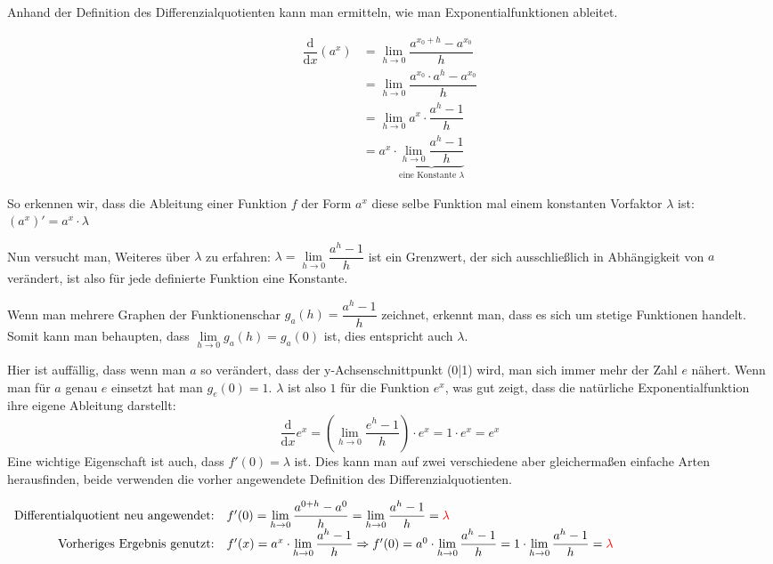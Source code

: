 \documentclass[main.tex]{subfiles}
\begin{document}
Anhand der Definition des Differenzialquotienten kann man ermitteln, wie man Exponentialfunktionen ableitet.

\begin{Beweis}
	\begin{align*}
		\dfrac{\text{d}}{\text{d}x}(a^x) &=\lim\limits_{h\to0}\dfrac{a^{{x_0}+h}-a^{x_0}}{h}\\
		&=\lim\limits_{h\to0}\dfrac{a^{x_0}\cdot a^h-a^{x_0}}{h}\\
		&=\lim\limits_{h\to0}a^x\cdot\dfrac{a^h-1}{h}\\
		&=a^x\cdot\underbrace{\lim\limits_{h\to0}\dfrac{a^h-1}{h}}_{\text{eine Konstante }\lambda}
	\end{align*}
\end{Beweis}

So erkennen wir, dass die Ableitung einer Funktion $f$ der Form $a^x$ diese selbe Funktion mal einem konstanten Vorfaktor $\lambda$ ist: $(a^x)'=a^x\cdot\lambda$

Nun versucht man, Weiteres über $\lambda$ zu erfahren: $\lambda=\lim\limits_{h\to0}\dfrac{a^h-1}{h}$ ist ein Grenzwert, der sich ausschließlich in Abhängigkeit von $a$ verändert,  ist also für jede definierte Funktion eine Konstante.

Wenn man mehrere Graphen der Funktionenschar $g_a(h)=\dfrac{a^h-1}{h}$ zeichnet, erkennt man, dass es sich um stetige Funktionen handelt. Somit kann man behaupten, dass $\lim\limits_{h\to0}g_a(h)=g_a(0)$ ist, dies entspricht auch $\lambda$.

Hier ist auffällig, dass wenn man $a$ so verändert, dass der y-Achsenschnittpunkt (0|1) wird, man sich immer mehr der Zahl $e$ nähert. Wenn man für $a$ genau $e$ einsetzt hat man $ g_e(0)=1$. $\lambda$ ist also $1$ für die Funktion $e^x$, was gut zeigt, dass die natürliche Exponentialfunktion ihre eigene Ableitung darstellt:
$$\dfrac{\text{d}}{\text{d}x}e^x=(\lim\limits_{h\to0}\dfrac{e^h-1}{h})\cdot e^x=1\cdot e^x=e^x$$
Eine wichtige Eigenschaft ist auch, dass $f'(0)=\lambda$ ist. Dies kann man auf zwei verschiedene aber gleichermaßen einfache Arten herausfinden, beide verwenden die vorher angewendete Definition des Differenzialquotienten.

$\begin{array}{rl}
	\text{Differentialquotient neu angewendet:}& f'(0)=\lim\limits_{h\to0}\dfrac{a^{0+h}-a^0}{h}=\lim\limits_{h\to0}\dfrac{a^h-1}{h}=\textcolor{red}{\lambda}\\
	\text{Vorheriges Ergebnis genutzt:}&f'(x)=a^x\cdot\lim\limits_{h\to0}\dfrac{a^h-1}{h}\Rightarrow f'(0)=a^0\cdot\lim\limits_{h\to0}\dfrac{a^h-1}{h}=1\cdot\lim\limits_{h\to0}\dfrac{a^h-1}{h}=\textcolor{red}{\lambda}
\end{array}$
\end{document}
